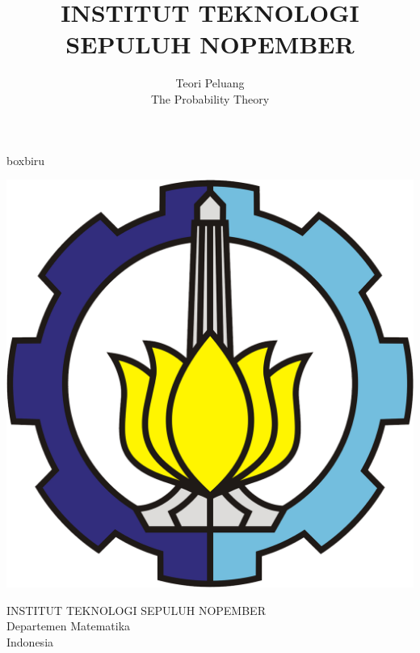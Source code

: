 \documentclass[10pt]{beamer}
\date{}
\title{INSTITUT TEKNOLOGI SEPULUH NOPEMBER}
\author{Teori Peluang\part{The Probability Theory}}
\institute{by Team Teaching}
\begin{document}
\begin{frame}[plain]
    \transboxout

    \vspace{10ex}

    \begin{beamercolorbox}[wd=\textwidth,rounded=true,shadow=true]{boxbiru}
        \centering
        \\[1.5ex]
    \end{beamercolorbox}


    \vspace*{6ex}

    \centerline{\includegraphics[scale=.1]{logoITS}}

    \vspace*{2ex}

    \begin{center}
    \tiny
    \rm
    \color{magenta!50!cyan!100}
    INSTITUT TEKNOLOGI SEPULUH NOPEMBER\\
    Departemen Matematika\\
    Indonesia\\
    \end{center}
\end{frame}%
\end{document}
